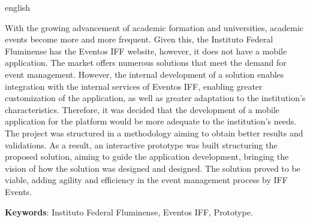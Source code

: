 \begin{resumo}[Abstract]
 \begin{otherlanguage*}{english}
  
With the growing advancement of academic formation and universities, academic events become more and more frequent. Given this, the Instituto Federal Fluminense has the Eventos IFF website, however, it does not have a mobile application. The market offers numerous solutions that meet the demand for event management. However, the internal development of a solution enables integration with the internal services of Eventos IFF, enabling greater customization of the application, as well as greater adaptation to the institution's characteristics. Therefore, it was decided that the development of a mobile application for the platform would be more adequate to the institution's needs. The project was structured in a methodology aiming to obtain better results and validations. As a result, an interactive prototype was built structuring the proposed solution, aiming to guide the application development, bringing the vision of how the solution was designed and designed. The solution proved to be viable, adding agility and efficiency in the event management process by IFF Events.
 
   \noindent 
   \textbf{Keywords}:  Instituto Federal Fluminense, Eventos IFF, Prototype.
 \end{otherlanguage*}
\end{resumo}